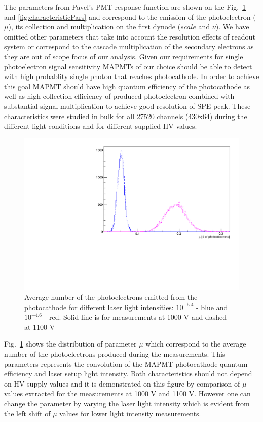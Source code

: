 \documentclass[5p,times,preprint]{elsarticle}
\begin{document}
The parameters from Pavel's PMT response function are shown on the Fig.~\ref{fig:mu} and \ref{fig:characteristicPars} and correspond to the emission of the photoelectron ($\mu$), its collection and multiplication on the first dynode ($scale$ and $\nu$).
We have omitted other parameters that take into account the resolution effects of readout system or correspond to the cascade multiplication of the secondary electrons as they are out of scope focus of our analysis.
Given our requirements for single photoelectron signal sensitivity MAPMTs of our choice should be able to detect with high probablity single photon that reaches photocathode.
In order to achieve this goal MAPMT should have high quantum efficiency of the photocathode as well as high collection efficiency of produced photoelectron combined with substantial signal multiplication to achieve good resolution of SPE peak.
These characteristics were studied in bulk for all 27520 channels (430x64) during the different light conditions and for different supplied HV values.

\begin{figure}[bt]
	\centering
	\includegraphics[width=0.8\linewidth]{mu.pdf}
	\caption{Average number of the photoelectrons emitted from the photocathode for different laser light intensities: $10^{-5.4}$ - blue and $10^{-4.6}$ - red. Solid line is for measurements at 1000 V and dashed - at 1100 V}
	\label{fig:mu}
\end{figure}

Fig.~\ref{fig:mu} shows the distribution of parameter $\mu$ which correspond to the average number of the photoelectrons produced during the measurements.
This parameters represents the convolution of the MAPMT photocathode quantum efficiency and laser setup light intensity.
Both characteristics should not depend on HV supply values and it is demonstrated on this figure by comparison of $\mu$ values extracted for the measurements at 1000 V and 1100 V.
However one can change the parameter by varying the laser light intensity which is evident from the left shift of $\mu$ values for lower light intensity measurements.
\end{document}
